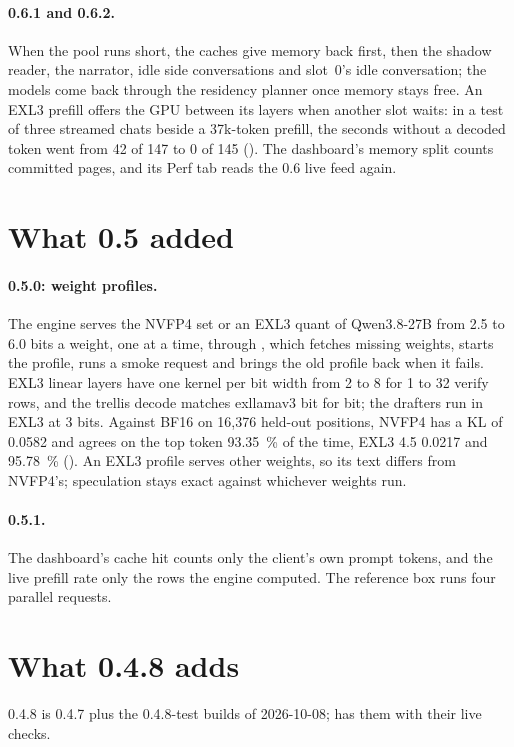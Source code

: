 \paragraph{0.6.1 and 0.6.2.} When the pool runs short, the caches give memory back first, then the shadow reader, the narrator, idle side conversations and slot~0's idle conversation; the models come back through the residency planner once memory stays free. An EXL3 prefill offers the GPU between its layers when another slot waits: in a test of three streamed chats beside a 37k-token prefill, the seconds without a decoded token went from 42 of 147 to 0 of 145 (\measured). The dashboard's memory split counts committed pages, and its Perf tab reads the 0.6 live feed again.

\section{What 0.5 added}

\paragraph{0.5.0: weight profiles.} The engine serves the NVFP4 set or an EXL3 quant of Qwen3.8-27B from 2.5 to 6.0 bits a weight, one at a time, through , which fetches missing weights, starts the profile, runs a smoke request and brings the old profile back when it fails. EXL3 linear layers have one kernel per bit width from 2 to 8 for 1 to 32 verify rows, and the trellis decode matches exllamav3 bit for bit; the drafters run in EXL3 at 3 bits. Against BF16 on 16,376 held-out positions, NVFP4 has a KL of 0.0582 and agrees on the top token 93.35~\% of the time, EXL3 4.5 0.0217 and 95.78~\% (\measured). An EXL3 profile serves other weights, so its text differs from NVFP4's; speculation stays exact against whichever weights run.

\paragraph{0.5.1.} The dashboard's cache hit counts only the client's own prompt tokens, and the live prefill rate only the rows the engine computed. The reference box runs four parallel requests.

\section{What 0.4.8 adds}

0.4.8 is 0.4.7 plus the 0.4.8-test builds of 2026-10-08;  has them with their live checks.

